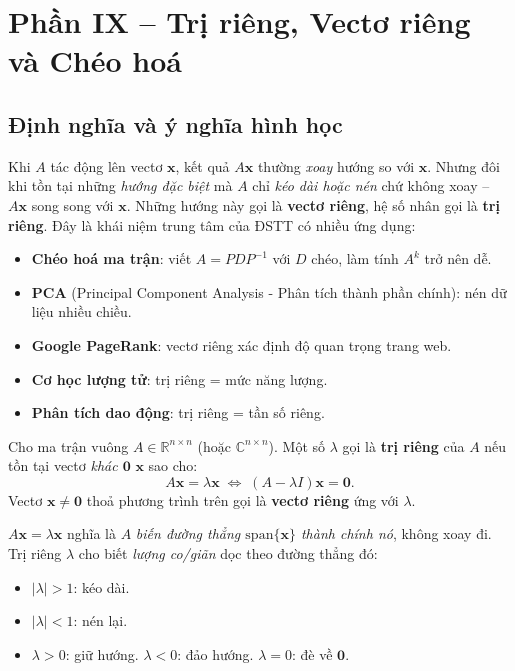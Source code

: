 \documentclass[12pt,a4paper]{article}
\begin{document}
\newpage

\section{Phần IX -- Trị riêng, Vectơ riêng và Chéo hoá}

\subsection{Định nghĩa và ý nghĩa hình học}

\begin{dongco}
Khi $A$ tác động lên vectơ $\mathbf{x}$, kết quả $A\mathbf{x}$ thường \emph{xoay} hướng so với $\mathbf{x}$. Nhưng đôi khi tồn tại những \emph{hướng đặc biệt} mà $A$ chỉ \emph{kéo dài hoặc nén} chứ không xoay -- $A\mathbf{x}$ song song với $\mathbf{x}$. Những hướng này gọi là \textbf{vectơ riêng}, hệ số nhân gọi là \textbf{trị riêng}. Đây là khái niệm trung tâm của ĐSTT có nhiều ứng dụng:
\begin{itemize}
  \item \textbf{Chéo hoá ma trận}: viết $A = PDP^{-1}$ với $D$ chéo, làm tính $A^k$ trở nên dễ.
  \item \textbf{PCA} (Principal Component Analysis - Phân tích thành phần chính): nén dữ liệu nhiều chiều.
  \item \textbf{Google PageRank}: vectơ riêng xác định độ quan trọng trang web.
  \item \textbf{Cơ học lượng tử}: trị riêng = mức năng lượng.
  \item \textbf{Phân tích dao động}: trị riêng = tần số riêng.
\end{itemize}
\end{dongco}

\begin{dinhnghia}
  Cho ma trận vuông $A \in \mathbb{R}^{n\times n}$ (hoặc $\mathbb{C}^{n\times n}$). Một số $\lambda$ gọi là \textbf{trị riêng} của $A$ nếu tồn tại vectơ \emph{khác $\mathbf{0}$} $\mathbf{x}$ sao cho:
  \[
    A\mathbf{x} = \lambda \mathbf{x} \;\Longleftrightarrow\; (A - \lambda I)\mathbf{x} = \mathbf{0}.
  \]
  Vectơ $\mathbf{x} \ne \mathbf{0}$ thoả phương trình trên gọi là \textbf{vectơ riêng} ứng với $\lambda$.
\end{dinhnghia}

\begin{ynghia}[title={Hình học}]
$A\mathbf{x} = \lambda \mathbf{x}$ nghĩa là $A$ \emph{biến đường thẳng $\mathrm{span}\{\mathbf{x}\}$ thành chính nó}, không xoay đi. Trị riêng $\lambda$ cho biết \emph{lượng co/giãn} dọc theo đường thẳng đó:
\begin{itemize}
  \item $|\lambda| > 1$: kéo dài.
  \item $|\lambda| < 1$: nén lại.
  \item $\lambda > 0$: giữ hướng. $\lambda < 0$: đảo hướng. $\lambda = 0$: đè về $\mathbf{0}$.
\end{itemize}
\end{ynghia}
\end{document}
